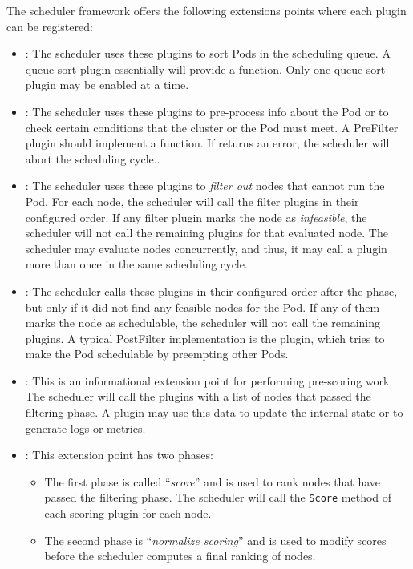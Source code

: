 The scheduler framework offers the following extensions points where each plugin
can be registered:

\begin{itemize}
      \item
            \textbf{}: The scheduler uses these plugins to sort
            Pods in the scheduling queue. A queue sort plugin essentially will
            provide a  function. Only one queue sort plugin
            may be enabled at a time.
      \item
            \textbf{}: The scheduler uses these plugins to
            pre-process info about the Pod or to check certain conditions that
            the cluster or the Pod must meet. A PreFilter plugin should
            implement a  function. If  returns an
            error, the scheduler will abort the scheduling cycle..
      \item
            \textbf{}: The scheduler uses these plugins to
            \textit{filter out} nodes that cannot run the Pod. For each node,
            the scheduler will call the filter plugins in their configured
            order. If any filter plugin marks the node as \textit{infeasible},
            the scheduler will not call the remaining plugins for that evaluated
            node. The scheduler may evaluate nodes concurrently, and thus, it
            may call a  plugin more than once in the same scheduling
            cycle.
      \item
            \textbf{}: The scheduler calls these plugins in their
            configured order after the  phase, but only if it did not
            find any feasible nodes for the Pod. If any of them marks the node
            as schedulable, the scheduler will not call the remaining plugins. A
            typical PostFilter implementation is the  plugin,
            which tries to make the Pod schedulable by preempting other Pods.
      \item
            \textbf{}: This is an informational extension point for
            performing pre-scoring work. The scheduler will call the plugins
            with a list of nodes that passed the filtering phase. A plugin may
            use this data to update the internal state or to generate logs or
            metrics.
      \item
            \textbf{}: This extension point has two phases:
            \begin{itemize}
                  \item
                        The first phase is called ``\textit{score}'' and is used
                        to rank nodes that have passed the filtering phase. The
                        scheduler will call the \texttt{Score} method of each
                        scoring plugin for each node.
                  \item The second phase is ``\textit{normalize scoring}'' and
                        is used to modify scores before the scheduler computes a
                        final ranking of nodes.
            \end{itemize}


\end{itemize}
